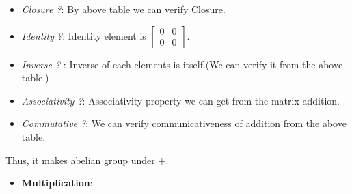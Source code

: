 \documentclass[
]{book}
\providecommand{\tightlist}{%
  \setlength{\itemsep}{0pt}\setlength{\parskip}{0pt}}
\theoremstyle{definition}
\theoremstyle{definition}
\theoremstyle{definition}
\theoremstyle{definition}
\theoremstyle{remark}
\begin{document}
\begin{itemize}
\tightlist
\item
  \emph{Closure ?}: By above table we can verify Closure.
\item
  \emph{Identity ?}: Identity element is \(\begin{bmatrix} 0 & 0 \\ 0 & 0 \end{bmatrix}\).
\item
  \emph{Inverse ?} : Inverse of each elements is itself.(We can verify it from the above table.)
\item
  \emph{Associativity ?}: Associativity property we can get from the matrix addition.
\item
  \emph{Commutative ?}: We can verify communicativeness of addition from the above table.
\end{itemize}

Thus, it makes abelian group under \(+\).

\begin{itemize}
\tightlist
\item
  \textbf{Multiplication}:
\end{itemize}
\end{document}
